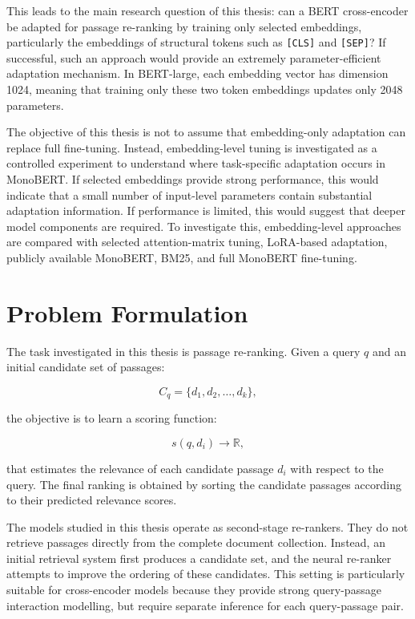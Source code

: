 This leads to the main research question of this thesis: can a BERT cross-encoder be adapted for passage re-ranking by training only selected embeddings, particularly the embeddings of structural tokens such as \texttt{[CLS]} and \texttt{[SEP]}? If successful, such an approach would provide an extremely parameter-efficient adaptation mechanism. In BERT-large, each embedding vector has dimension 1024, meaning that training only these two token embeddings updates only 2048 parameters.

The objective of this thesis is not to assume that embedding-only adaptation can replace full fine-tuning. Instead, embedding-level tuning is investigated as a controlled experiment to understand where task-specific adaptation occurs in MonoBERT. If selected embeddings provide strong performance, this would indicate that a small number of input-level parameters contain substantial adaptation information. If performance is limited, this would suggest that deeper model components are required. To investigate this, embedding-level approaches are compared with selected attention-matrix tuning, LoRA-based adaptation, publicly available MonoBERT, BM25, and full MonoBERT fine-tuning.

\section{Problem Formulation}
\label{sec:introduction_problem}

The task investigated in this thesis is passage re-ranking. Given a query $q$ and an initial candidate set of passages:

\begin{equation}
    C_q = \{d_1, d_2, \ldots, d_k\},
\end{equation}

the objective is to learn a scoring function:

\begin{equation}
    s(q,d_i) \rightarrow \mathbb{R},
\end{equation}

that estimates the relevance of each candidate passage $d_i$ with respect to the query. The final ranking is obtained by sorting the candidate passages according to their predicted relevance scores.

The models studied in this thesis operate as second-stage re-rankers. They do not retrieve passages directly from the complete document collection. Instead, an initial retrieval system first produces a candidate set, and the neural re-ranker attempts to improve the ordering of these candidates. This setting is particularly suitable for cross-encoder models because they provide strong query-passage interaction modelling, but require separate inference for each query-passage pair.

